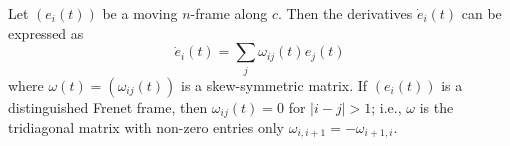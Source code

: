 Let $(e_i(t))$ be a moving $n$-frame along $c$. Then the derivatives $\dot{e}_i(t)$ can be expressed as
$$\dot{e}_i(t) = \sum_j \omega_{ij}(t) e_j(t)$$
where $\omega(t) = (\omega_{ij}(t))$ is a skew-symmetric matrix. If $(e_i(t))$ is a distinguished Frenet frame, then $\omega_{ij}(t) = 0$ for $|i - j| > 1$; i.e., $\omega$ is the tridiagonal matrix with non-zero entries only $\omega_{i,i+1} = -\omega_{i+1,i}$.